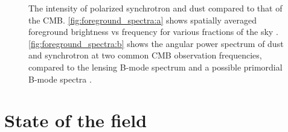 \begin{figure}[!ht]
    \hfill
    \caption[Polarized foreground frequency and angular power spectra]{The intensity of polarized synchrotron and dust compared to that of the CMB. \ref{fig:foreground_spectra:a} shows spatially averaged foreground brightness vs frequency for various fractions of the sky \cite{planck_collaboration_planck_2019}. \ref{fig:foreground_spectra:b} shows the angular power spectrum of dust and synchrotron at two common CMB observation frequencies, compared to the lensing B-mode spectrum and a possible primordial B-mode spectra \cite{planck_collaboration_planck_2018}.}
    \label{fig:foreground_spectra}
\end{figure}

\section{State of the field}

